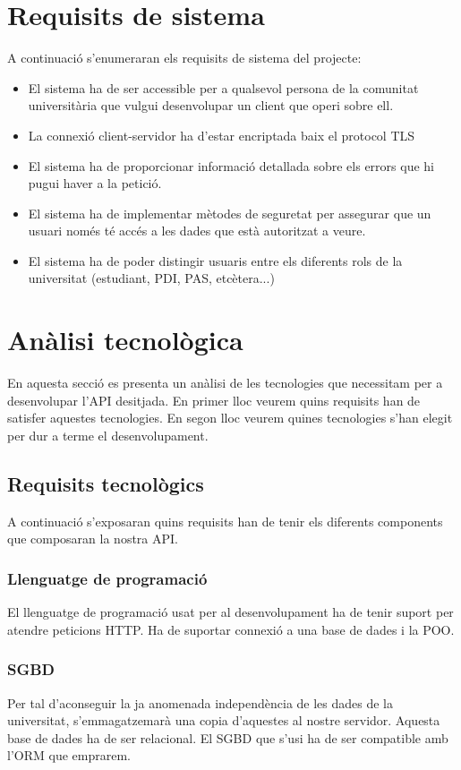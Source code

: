 \section{Requisits de sistema}
A continuació s'enumeraran els requisits de sistema del projecte:
\begin{itemize}
	\item El sistema ha de ser accessible per a qualsevol persona de la comunitat universitària que vulgui desenvolupar un client que operi sobre ell.
	\item La connexió client-servidor ha d'estar encriptada baix el protocol \ac{TLS}
	\item El sistema ha de proporcionar informació detallada sobre els errors que hi pugui haver a la petició.
	\item El sistema ha de implementar mètodes de seguretat per assegurar que un usuari només té accés a les dades que està autoritzat a veure.
	\item El sistema ha de poder distingir usuaris entre els diferents rols de la universitat (estudiant, \ac{PDI}, \ac{PAS}, etcètera...)
\end{itemize}

\section{Anàlisi tecnològica}
En aquesta secció es presenta un anàlisi de les tecnologies que necessitam per a desenvolupar l'\ac{API} desitjada. En primer lloc veurem quins requisits han de satisfer aquestes tecnologies. En segon lloc veurem quines tecnologies s'han elegit per dur a terme el desenvolupament.

\subsection{Requisits tecnològics}
A continuació s'exposaran quins requisits han de tenir els diferents components que composaran la nostra \ac{API}. 
	
	\subsubsection{Llenguatge de programació}
	El llenguatge de programació usat per al desenvolupament ha de tenir suport per atendre peticions \ac{HTTP}. Ha de suportar connexió a una base de dades i la \ac{POO}.
	
	\subsubsection{\ac{SGBD}}
	Per tal d'aconseguir la ja anomenada independència de les dades de la universitat, s'emmagatzemarà una copia d'aquestes al nostre servidor. Aquesta base de dades ha de ser relacional. El \ac{SGBD} que s'usi ha de ser compatible amb l'\ac{ORM} que emprarem.

